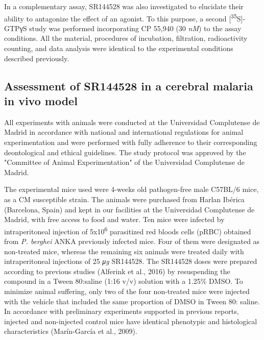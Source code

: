 \documentclass[empirical, authordate, issue]{jote-new-article}
\begin{document}
In a complementary assay, SR144528 was also investigated to elucidate their ability to antagonize the effect of an agonist. To this purpose, a second [\textsuperscript{35}S]-GTPγS study was performed incorporating CP 55,940 (30 \emph{nM}) to the assay conditions. All the material, procedures of incubation, filtration, radioactivity counting, and data analysis were identical to the experimental conditions described previously.

\subsection{Assessment of SR144528 in a cerebral malaria in vivo model}

All experiments with animals were conducted at the Universidad Complutense de Madrid in accordance with national and international regulations for animal experimentation and were performed with fully adherence to their corresponding deontological and ethical guidelines. The study protocol was approved by the "Committee of Animal Experimentation" of the Universidad Complutense de Madrid.


The experimental mice used were 4-weeks old pathogen-free male C57BL/6 mice, as a CM susceptible strain. The animals were purchased from Harlan Ibérica (Barcelona, Spain) and kept in our facilities at the Universidad Complutense de Madrid, with free access to food and water. Ten mice were infected by intraperitoneal injection of 5x10\textsuperscript{6} parasitized red bloods cells (pRBC) obtained from \emph{P. berghei}\emph{\textbf{ }}ANKA previously infected mice. Four of them were designated as non-treated mice, whereas the remaining six animals were treated daily with intraperitoneal injections of 25 \emph{μg} SR144528. The SR144528 doses were prepared according to previous studies (Alferink et al., 2016) by resuspending the compound in a Tween 80:saline (1:16 v/v) solution with a 1.25\% DMSO. To minimize animal suffering, only two of the four non-treated mice were injected with the vehicle that included the same proportion of DMSO in Tween 80: saline. In accordance with preliminary experiments supported in previous reports, injected and non-injected control mice have identical phenotypic and histological characteristics (Marín-García et al., 2009).
\end{document}
